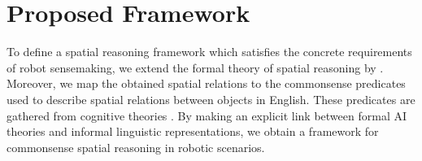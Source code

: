 \documentclass{article}
\begin{document}


\section{Proposed Framework}
To define a spatial reasoning framework which satisfies the concrete requirements of robot sensemaking, we extend the formal theory of spatial reasoning by \cite{borrmann_query_2010}. Moreover, we map the obtained spatial relations to the commonsense predicates used to describe spatial relations between objects in English. These predicates are gathered from cognitive theories \cite{landau_what_1993}. By making an explicit link between formal AI theories and informal linguistic representations, we obtain a framework for commonsense spatial reasoning in robotic scenarios. 
\end{document}
